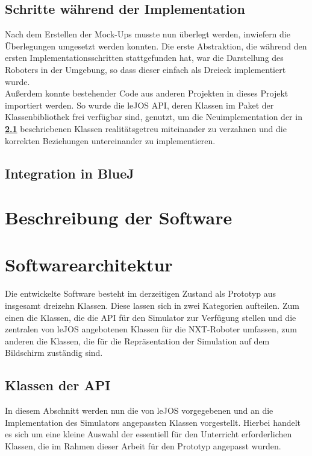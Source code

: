 \documentclass[paper=a4, pagesize, DIV=calc, BCOR=12.5mm, twoside=on, onecolumn=on, open = any, titlepage =on, parskip =half-, headsepline = on, footsepline = on, chapterprefix = on, appendixprefix = off, fontsize = 12pt, numbers = noenddot, abstract = on]{scrbook}
\numberwithin{equation}{chapter}
\theoremstyle{definition}
\theoremstyle{plain}
\theoremstyle{plain}
\theoremstyle{remark}
\theoremstyle{plain}
\theoremstyle{plain}
\begin{document}
\subsection{Schritte während der Implementation}
\onehalfspacing
Nach dem Erstellen der Mock-Ups musste nun überlegt werden, inwiefern die Überlegungen umgesetzt werden konnten. Die erste Abstraktion, die während den ersten Implementationsschritten stattgefunden hat, war die Darstellung des Roboters in der Umgebung, so dass dieser einfach als Dreieck implementiert wurde.\\

Außerdem konnte bestehender Code aus anderen Projekten in dieses Projekt importiert werden. So wurde die leJOS API, deren Klassen im Paket der Klassenbibliothek  frei verfügbar sind, genutzt, um die Neuimplementation der in \textbf{\ref{sec:API}} beschriebenen Klassen realitätsgetreu miteinander zu verzahnen und die korrekten Beziehungen untereinander zu implementieren.

\par \singlespacing
\subsection{Integration in BlueJ}
\onehalfspacing

\par \singlespacing
\section{Beschreibung der Software}
\onehalfspacing

\par \singlespacing
\section{Softwarearchitektur}
\onehalfspacing 
Die entwickelte Software besteht im derzeitigen Zustand als Prototyp aus insgesamt dreizehn Klassen. Diese lassen sich in zwei Kategorien aufteilen. Zum einen die Klassen, die die API für den Simulator zur Verfügung stellen und die zentralen von leJOS angebotenen Klassen für die NXT-Roboter umfassen, zum anderen die Klassen, die für die Repräsentation der Simulation auf dem Bildschirm zuständig sind.\\

\par \singlespacing
\subsection{Klassen der API}
\label{sec:API}
\onehalfspacing
In diesem Abschnitt werden nun die von leJOS vorgegebenen und an die Implementation des Simulators angepassten Klassen vorgestellt. Hierbei handelt es sich um eine kleine Auswahl der essentiell für den Unterricht erforderlichen Klassen, die im Rahmen dieser Arbeit für den Prototyp angepasst wurden. 
\end{document}
